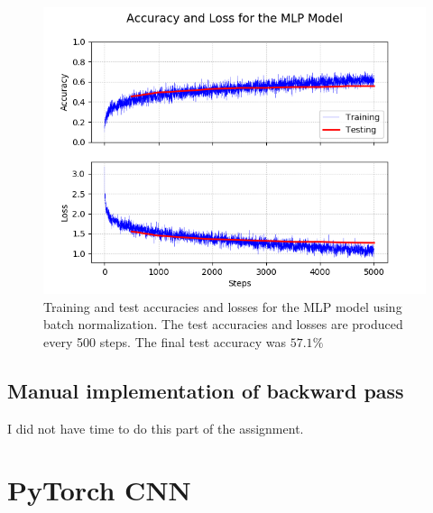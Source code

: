 \documentclass{article}
\begin{document}
\begin{figure}[h]
    \centering
    \includegraphics[scale=0.7]{img/mlp_results.png}
    \caption{Training and test accuracies and losses for the MLP model using batch normalization. The test accuracies and losses are produced every 500 steps. The final test accuracy was $57.1 \%$}
    \label{fig:mlp_batchnorm_results}
\end{figure}

\subsection{Manual implementation of backward pass}

I did not have time to do this part of the assignment.

%
%

\section{PyTorch CNN}
\end{document}
